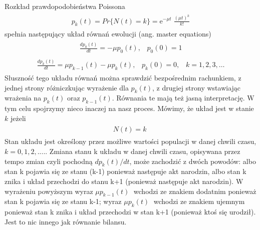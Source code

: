 \documentclass[a4paper,12pt,polish]{sphinxmanual}
\begin{document}
Rozkład prawdopodobieństwa Poissona
\label{ch3/chIII021:equation-eqn41}\begin{gather}
\begin{split} p_k(t) = Pr\{N(t) = k\} = \mbox{e}^{-\mu t} \; \frac{(\mu t)^k}{k!}\end{split}\label{ch3/chIII021-eqn41}
\end{gather}
spełnia następujący układ równań ewolucji (ang. master equations)
\label{ch3/chIII021:equation-eqn42}\begin{gather}
\begin{split}\frac{dp_0(t)}{dt} = -\mu p_0(t), \; \; \; p_0(0) = 1\end{split}\label{ch3/chIII021-eqn42}
\end{gather}\label{ch3/chIII021:equation-eqn43}\begin{gather}
\begin{split}\frac{dp_k(t)}{dt} = \mu p_{k-1}(t) -\mu p_k(t), \; \; \; p_k(0) = 0, \; \; \; k=1, 2, 3, \dots\end{split}\label{ch3/chIII021-eqn43}
\end{gather}
Słuszność tego układu równań można sprawdzić bezpośrednim rachunkiem, z jednej strony różniczkując wyrażenie dla $p_k(t)$, z drugiej strony wstawiając wrażenia na $p_k(t)$ oraz $p_{k-1}(t)$. Równania te mają też jasną interpretację. W tym celu spojrzymy nieco inaczej na nasz proces. Mówimy, że układ jest w stanie $k$ jeżeli
\label{ch3/chIII021:equation-eqn44}\begin{gather}
\begin{split}N(t) =k\;\end{split}\label{ch3/chIII021-eqn44}
\end{gather}
Stan układu jest określony przez możliwe wartości populacji w danej chwili czasu, $k=0, 1, 2,....$.
Zmiana stanu k układu w danej chwili czasu, opisywana przez tempo zmian czyli pochodną $dp_k(t)/dt$, może zachodzić z dwóch powodów: albo stan k pojawia się ze stanu (k-1) ponieważ następuje akt narodzin, albo stan k znika i układ przechodzi do stanu k+1 (ponieważ następuje akt narodzin). W wyrażeniu powyższym
wyraz $\mu p_{k-1}(t)\;$ wchodzi ze znakiem dodatnim ponieważ stan k pojawia się ze stanu k-1; wyraz $\mu p_{k}(t)\;$ wchodzi ze znakiem ujemnym ponieważ stan k znika i układ przechodzi w stan k+1 (ponieważ ktoś się urodził). Jest to nic innego jak równanie bilansu.
\end{document}
